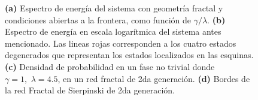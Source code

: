 \begin{figure}[h!]
\begin{subfigure}[b!]{0.24 \textwidth}
    \end{subfigure}\hspace*{-0.5em} \vspace*{-0.5em}
        \caption{\textbf{(a)} Espectro de energía del sistema con geometría fractal y condiciones abiertas a la frontera, como función de $\gamma/\lambda$. \textbf{(b)} Espectro de energía en escala logarítmica del sistema antes mencionado. Las lineas rojas corresponden a los cuatro estados degenerados que representan los estados localizados en las esquinas. \textbf{(c)} Densidad de probabilidad en un fase no trivial donde $\gamma = 1,\, \, \lambda = 4.5$, en un red fractal de 2da generación. \textbf{(d)} Bordes de la red Fractal de Sierpinski de 2da generación.}
\label{fig:Param_Proy_fractal}
\end{figure}